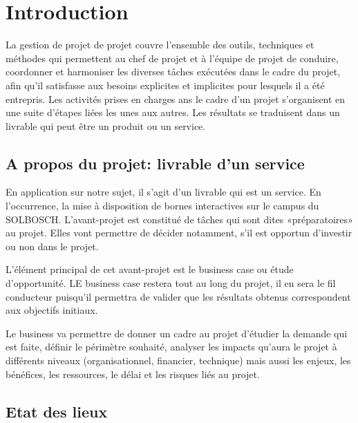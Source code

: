 
\chapter{Introduction}
La gestion de projet de projet couvre l’ensemble des outils, techniques et méthodes qui permettent au chef de projet et à l’équipe de projet de conduire, coordonner et harmoniser les diverses tâches exécutées dans le cadre du projet, afin qu’il satisfasse aux besoins explicites et implicites pour lesquels il a été entrepris. 
Les activités prises en charges ans le cadre d’un projet s’organisent en une suite d’étapes liées les unes aux autres. Les résultats se traduisent dans un livrable qui peut être un produit ou un service. 

\section{A propos du projet: livrable d'un service}
En application sur notre sujet, il s’agit d’un livrable qui est un service. En l’occurrence, la mise à disposition de bornes interactives sur le campus du SOLBOSCH. 
L’avant-projet est constitué de tâches qui sont dites «préparatoires» au projet. Elles vont permettre de décider notamment, s’il est opportun d’investir ou non dans le projet. 

L’élément principal de cet avant-projet est le business case ou étude d’opportunité. LE business case restera tout au long du projet, il en sera le fil conducteur puisqu’il permettra de valider que les résultats obtenus correspondent aux objectifs initiaux. 

Le business va permettre de donner un cadre au projet d’étudier la demande qui est faite, définir le périmètre souhaité, analyser les impacts qu’aura le projet à différents niveaux (organisationnel, financier, technique) mais aussi les enjeux, les bénéfices, les ressources, le délai et les risques liés au projet. 

 
\section{Etat des lieux}

